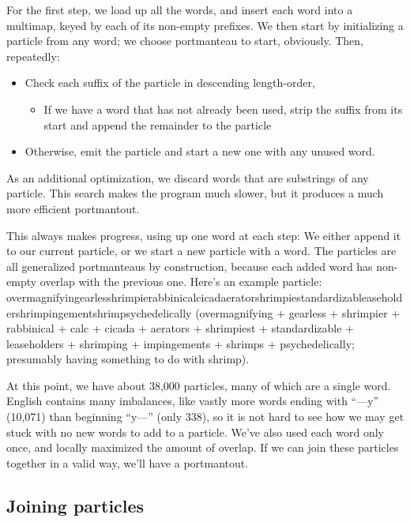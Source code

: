 \documentclass{article}
\begin{document}
For the first step, we load up all the words, and insert each word
into a multimap, keyed by each of its non-empty prefixes. We then
start by initializing a particle from any word; we choose {\sf
  portmanteau} to start, obviously. Then, repeatedly:
\begin{itemize}
\item Check each suffix of the particle in descending length-order,
\begin{itemize}
  \item If we have a word that has not already been used, strip the suffix from its start and append the remainder to the particle
\end{itemize}
\item Otherwise, emit the particle and start a new one with any unused word.
\end{itemize}

As an additional optimization, we discard words that are
substrings of any particle. This search makes the program much slower,
but it produces a much more efficient portmantout.

This always makes progress, using up one word at each step: We either
append it to our current particle, or we start a new particle with a
word. The particles are all generalized portmanteaus by construction,
because each added word has non-empty overlap with the previous one.
Here's an example particle: {\sf overmagnify\-ingearlesshrimp\-ierabbinicalci\-cadaeratorshrimpiestandard\-izablease\-holdershrimp\-inge\-mentshrimpsychedelically} ({\sf overmagnifying} + {\sf gearless} + {\sf shrimpier} + {\sf rabbinical} + {\sf calc} + {\sf cicada} + {\sf aerators} + {\sf shrimpiest} + {\sf standardizable} + {\sf leaseholders} + {\sf shrimping} + {\sf impingements} + {\sf shrimps} + {\sf psychedelically}; presumably having something to do with shrimp).

At this point, we have about 38,000 particles, many of which are a
single word. English contains many imbalances, like vastly more words
ending with ``---y'' (10,071) than beginning ``y---'' (only 338), so
it is not hard to see how we may get stuck with no new words to add to
a particle. We've also used each word only once, and locally maximized
the amount of overlap. If we can join these particles together in a
valid way, we'll have a portmantout.

\subsection{Joining particles} \label{sec:join}
\end{document}
